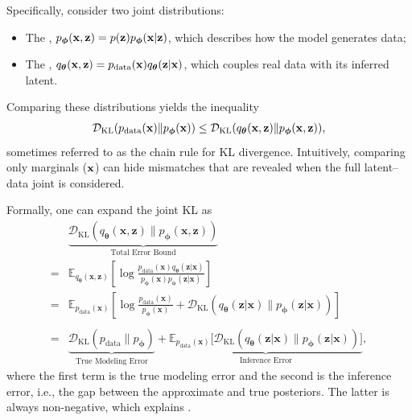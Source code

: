 Specifically, consider two joint distributions:
\begin{itemize}
    \item The , $p_{\bm{\phi}}({\mathbf{x}}, {\mathbf{z}}) = p({\mathbf{z}}) p_{\bm{\phi}}({\mathbf{x}}|{\mathbf{z}})$, which describes how the model generates data;
    \item The , $q_{\bm{\theta}}({\mathbf{x}}, {\mathbf{z}}) = p_{\text{data}}({\mathbf{x}}) q_{\bm{\theta}}({\mathbf{z}}|{\mathbf{x}})$, which couples real data with its inferred latent.
\end{itemize}
Comparing these distributions yields the inequality
\begin{align}\label{eq:joint-bound}
    \mathcal{D}_{\mathrm{KL}}(p_{\text{data}}({\mathbf{x}}) \| p_{\bm{\phi}}({\mathbf{x}})) 
    \leq \mathcal{D}_{\mathrm{KL}}(q_{\bm{\theta}}({\mathbf{x}},{\mathbf{z}}) \| p_{\bm{\phi}}({\mathbf{x}},{\mathbf{z}})),
\end{align}
sometimes referred to as the chain rule for KL divergence. 
Intuitively, comparing only marginals (${\mathbf{x}}$) can hide mismatches that are revealed when the full latent–data joint is considered.

Formally, one can expand the joint KL as
\begin{align*}
    &\underbrace{\mathcal{D}_{\mathrm{KL}}(q_{\bm{\theta}}(\mathbf{x}, \mathbf{z}) \| p_{\bm{\phi}}(\mathbf{x}, \mathbf{z}))}_{\text{Total Error Bound}} 
    \\=& \mathbb{E}_{q_{\bm{\theta}}(\mathbf{x}, \mathbf{z})} \left[ \log \frac{p_{\text{data}}(\mathbf{x}) q_{\bm{\theta}}(\mathbf{z}|\mathbf{x})}{p_{\bm{\phi}}(\mathbf{x}) p_{\bm{\phi}}(\mathbf{z}|\mathbf{x})} \right] \\=&\mathbb{E}_{p_{\text{data}}(\mathbf{x})} \left[ \log \frac{p_{\text{data}}(\mathbf{x})}{p_{\bm{\phi}}(\mathbf{x})} + \mathcal{D}_{\mathrm{KL}}\left( q_{\bm{\theta}}(\mathbf{z}|\mathbf{x}) \| p_{\bm{\phi}}(\mathbf{z}|\mathbf{x}) \right) \right] \\
    \\=&  \underbrace{\mathcal{D}_{\mathrm{KL}}(p_{\text{data}} \| p_{\bm{\phi}})}_{\text{True Modeling Error}} + \underbrace{\mathbb{E}_{p_{\text{data}}(\mathbf{x})} \big[ \mathcal{D}_{\mathrm{KL}}( q_{\bm{\theta}}(\mathbf{z}|\mathbf{x}) \| p_{\bm{\phi}}(\mathbf{z}|\mathbf{x}) ) \big]}_{\text{Inference Error}},
\end{align*}
where the first term is the true modeling error and the second is the inference error, i.e., the gap between the approximate and true posteriors. The latter is always non-negative, which explains .

